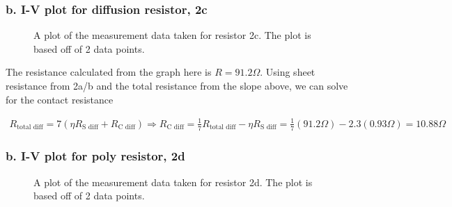 \documentclass{article}
\begin{document}
\subsubsection{b. I-V plot for diffusion resistor, 2c}
\begin{figure}[H]
\centering
{}
\caption{A plot of the measurement data taken for resistor 2c. The plot is based off of 2 data points.}
\end{figure}

The resistance calculated from the graph here is $R = 91.2 \Omega$. Using sheet resistance from 2a/b and the total resistance from the slope above, we can solve for the contact resistance

\begin{align*}
R_{\text{total diff}} = 7(\eta R_{\text{S diff}} + R_{\text{C diff}}) \Rightarrow R_{\text{C diff}} = \frac{1}{7}R_{\text{total diff}} - \eta R_{\text{S diff}} = \frac{1}{7}(91.2 \Omega) - 2.3(0.93 \Omega) = 10.88 \Omega
\end{align*}



\subsubsection{b. I-V plot for poly resistor, 2d}
\begin{figure}[H]
\centering
{}
\caption{A plot of the measurement data taken for resistor 2d. The plot is based off of 2 data points.}
\end{figure}
\end{document}
